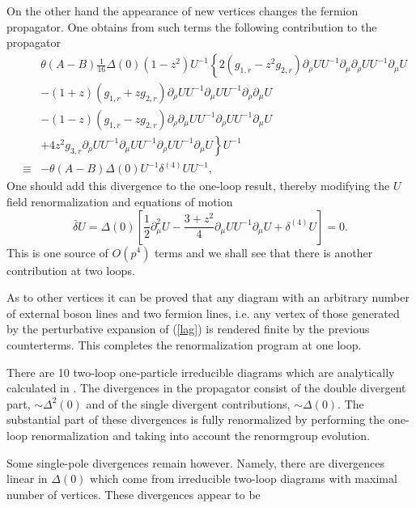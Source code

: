 \documentclass[a4paper,12pt]{article}
\begin{document}
On the other hand
the appearance of new vertices changes the  
fermion propagator. 
One obtains from such terms the following contribution to the propagator 
\begin{eqnarray}
&&\theta(A-B)\frac{1}{16}\Delta(0) (1-z^2)
U^{-1} \left\{2 (g_{1,r} - z^2 g_{2,r})
 \partial_{\rho} U  U^{-1} \partial_\mu\partial_\rho U  U^{-1}\partial_{\mu} U\right.\nonumber\\ 
&&\left.- (1+z) (g_{1,r} + z g_{2,r}) \partial_{\rho} U  U^{-1} \partial_\mu U  U^{-1} \partial_\rho\partial_{\mu} U\right.\nonumber\\ 
&&\left.
- (1-z) (g_{1,r} - z g_{2,r}) \partial_{\rho}\partial_\mu U  U^{-1} \partial_\rho U  U^{-1}\partial_{\mu} U\right.\nonumber\\ 
&&\left.
+4z^2 g_{3,r} \partial_{\rho} U  U^{-1} \partial_\mu U  U^{-1} \partial_\rho U  U^{-1}\partial_{\mu} U
\right\} U^{-1} \nonumber\\
&\equiv& - \theta(A-B)\Delta(0) U^{-1}  \delta^{(4)}U  U^{-1}, 
\label{dren}
\end{eqnarray}
One should  add 
this divergence to the one-loop result, thereby 
modifying the 
$U$ field renormalization and equations of motion
\begin{equation}
\bar\delta U = \Delta(0) \left[\frac12 \partial^2_{\mu} U - 
\frac{3 + z^2}{4}\partial_\mu U U^{-1}\partial_\mu U + \delta^{(4)}U\right]= 0.
\label{eom4}
\end{equation}
This is one source of $O(p^4)$ terms and we shall
see that there is another contribution at two loops.

As to other vertices it can be proved \cite{aabe} that
 any diagram with an arbitrary number of external
boson lines and two fermion lines, i.e. any vertex of those generated by the
perturbative expansion of
(\ref{lag}) is rendered finite by the previous counterterms. This completes
the renormalization program at one loop.

There are 10 two-loop one-particle irreducible diagrams which are 
analytically calculated 
in \cite{aabe}.
The divergences in the propagator consist of the double divergent
part, 
$ \sim \Delta^2(0)$ and of
the single divergent contributions,  
$\sim \Delta (0)$. The substantial part of these divergences is fully 
renormalized by performing the one-loop renormalization and taking into
account the renormgroup evolution.

Some single-pole divergences remain however. Namely, there are 
 divergences linear in
 $\Delta(0)$ which come from irreducible two-loop
diagrams with maximal number of vertices.
These  divergences appear to be\\
\end{document}
